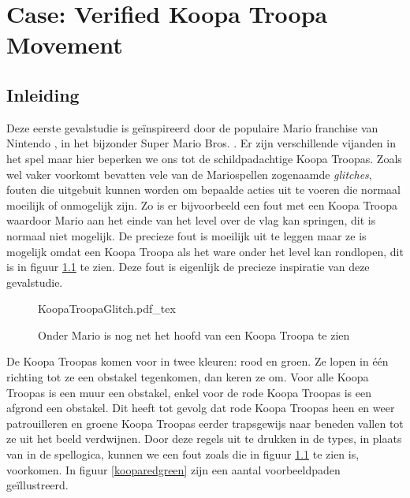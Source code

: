 \chapter{Case: Verified Koopa Troopa Movement}
\label{ch:case-koopa}


\section{Inleiding}

Deze eerste gevalstudie is geïnspireerd door de populaire Mario \cite{mario}
franchise van Nintendo \cite{nintendo}, in het bijzonder Super Mario Bros.
\cite{supmario}. Er zijn verschillende vijanden in het spel maar hier beperken
we ons tot de schildpadachtige Koopa Troopas. Zoals wel vaker voorkomt bevatten
vele van de Mariospellen zogenaamde \emph{glitches}, fouten die uitgebuit
kunnen worden om bepaalde acties uit te voeren die normaal moeilijk of
onmogelijk zijn. Zo is er bijvoorbeeld een fout met een Koopa Troopa waardoor
Mario aan het einde van het level over de vlag kan springen, dit is normaal
niet mogelijk. De precieze fout is moeilijk uit te leggen maar ze is mogelijk
omdat een Koopa Troopa als het ware onder het level kan rondlopen, dit is in
figuur \ref{koopaglitch} te zien. Deze fout is eigenlijk de precieze inspiratie
van deze gevalstudie.

\begin{figure}
  \centering
  \def\svgwidth{\textwidth}
  {KoopaTroopaGlitch.pdf\string_tex}
  \caption{Onder Mario is nog net het hoofd van een Koopa Troopa te zien
           \cite{marioglitchyoutube}}
  \label{koopaglitch}
\end{figure}

De Koopa Troopas komen voor in twee kleuren: rood en groen. Ze lopen in één
richting tot ze een obstakel tegenkomen, dan keren ze om. Voor alle Koopa
Troopas is een muur een obstakel, enkel voor de rode Koopa Troopas is een
afgrond een obstakel. Dit heeft tot gevolg dat rode Koopa Troopas heen en weer
patrouilleren en groene Koopa Troopas eerder trapsgewijs naar beneden vallen
tot ze uit het beeld verdwijnen. Door deze regels uit te drukken in de types,
in plaats van in de spellogica, kunnen we een fout zoals die in figuur
\ref{koopaglitch} te zien is, voorkomen. In figuur \ref{kooparedgreen} zijn een
aantal voorbeeldpaden geïllustreerd.

